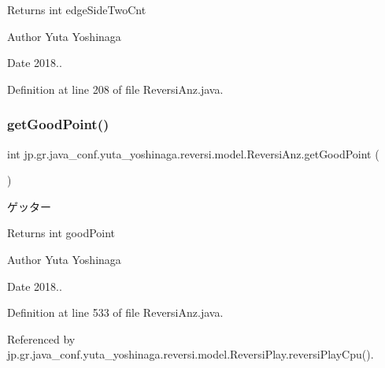 \begin{DoxyReturn}{Returns}
int edge\+Side\+Two\+Cnt 
\end{DoxyReturn}
\begin{DoxyAuthor}{Author}
Yuta Yoshinaga 
\end{DoxyAuthor}
\begin{DoxyDate}{Date}
2018.. 
\end{DoxyDate}


Definition at line 208 of file Reversi\+Anz.\+java.

\mbox{\label{classjp_1_1gr_1_1java__conf_1_1yuta__yoshinaga_1_1reversi_1_1model_1_1_reversi_anz_aeaf13ab6a9399b7621a6726a7cae566f}} 
\subsubsection{\texorpdfstring{get\+Good\+Point()}{getGoodPoint()}}
{\footnotesize\ttfamily int jp.\+gr.\+java\+\_\+conf.\+yuta\+\_\+yoshinaga.\+reversi.\+model.\+Reversi\+Anz.\+get\+Good\+Point (\begin{DoxyParamCaption}{ }\end{DoxyParamCaption})}



ゲッター 

\begin{DoxyReturn}{Returns}
int good\+Point 
\end{DoxyReturn}
\begin{DoxyAuthor}{Author}
Yuta Yoshinaga 
\end{DoxyAuthor}
\begin{DoxyDate}{Date}
2018.. 
\end{DoxyDate}


Definition at line 533 of file Reversi\+Anz.\+java.



Referenced by jp.\+gr.\+java\+\_\+conf.\+yuta\+\_\+yoshinaga.\+reversi.\+model.\+Reversi\+Play.\+reversi\+Play\+Cpu().

